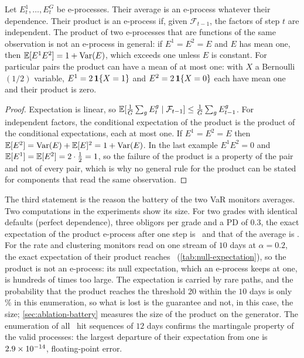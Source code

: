 \begin{proposition}
\label{prop:product}
Let $E^1_t,\dots,E^G_t$ be e-processes. Their average is an e-process whatever their dependence. Their product is an e-process if, given $\mathcal F_{t-1}$, the factors of step $t$ are independent. The product of two e-processes that are functions of the same
observation is not an e-process in general: if $E^1=E^2=E$ and $E$ has mean one, then $\mathbb{E}[E^1E^2]=1+\operatorname{Var}(E)$, which exceeds one unless $E$ is constant. For particular pairs the product can have a mean of at most one: with $X$ a Bernoulli$(1/2)$ variable, $E^1=2\,\mathbf{1}\{X=1\}$ and $E^2=2\,\mathbf{1}\{X=0\}$ each have mean one and their product is zero.
\end{proposition}
\begin{proof}
Expectation is linear, so $\mathbb{E}[\tfrac1G\sum_gE^g_t\mid\mathcal F_{t-1}]\le\tfrac1G\sum_gE^g_{t-1}$. For independent factors, the conditional expectation of the product is the product of the conditional expectations, each at most one. If $E^1=E^2=E$ then $\mathbb{E}[E^2]=\operatorname{Var}(E)+\mathbb{E}[E]^2=1+\operatorname{Var}(E)$. In the last example $E^1E^2=0$ and $\mathbb{E}[E^1]=\mathbb{E}[E^2]=2\cdot\tfrac12=1$, so the failure of the product is a property of the pair and not of every pair, which is why no general rule for the product can be stated for components that read the same observation.
\end{proof}

The third statement is the reason the battery of the two VaR monitors averages. Two computations in the experiments show its size. For two grades with identical defaults (perfect dependence), three obligors per grade and a PD of $0.3$, the exact expectation of the
product e-process after one step is \nProductPdProduct\ and that of the average is \nProductPdAverage. For the rate and clustering monitors read on one stream of $10$ days at $\alpha=0.2$, the exact expectation of their product reaches \nProductMax\ (\cref{tab:null-expectation}), so the product is not an e-process: its null expectation, which an e-process keeps at one, is hundreds of times too large. The expectation is carried by rare paths, and the probability that the product reaches the threshold 20 within the $10$ days is only \nProductRejectDayTen\,\% in this enumeration, so what is lost is the guarantee and not, in this case, the size; \cref{sec:ablation-battery} measures the size of the product on the generator.
The enumeration of all \nEnumSequences\ hit sequences of $12$ days confirms the martingale property of the valid processes: the largest departure of their expectation from one is $2.9\times 10^{-14}$, floating-point error.


